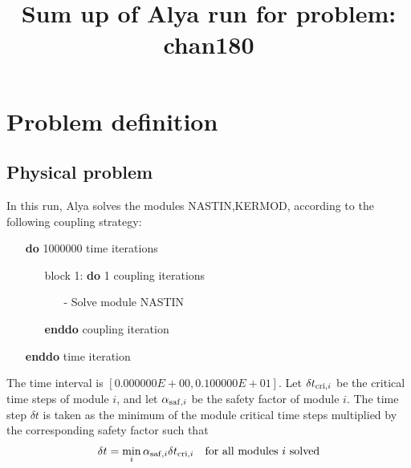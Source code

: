 \documentclass[10pt]{article}
\begin{document}
\title{Sum up of Alya run for problem: chan180}
\maketitle
\section{Problem definition}
\subsection{Physical problem}
In this run, Alya solves the modules NASTIN,KERMOD,
according to the following coupling strategy:
\begin{itemize}
  \item[] {\bf do}      1000000 time iterations 
  \begin{itemize}
\item[] block 1: {\bf do}   1 coupling iterations
\begin{itemize}
  \item[-] Solve module NASTIN
\end{itemize}
\item[] {\bf enddo} coupling iteration
  \end{itemize}
\item[] {\bf enddo} time iteration
\end{itemize}
The time interval is $[
0.000000E+00
,
0.100000E+01
]$.
Let $\delta t_{{\rm cri},i}$ be the critical time steps of module $i$,
and let $\alpha_{{\rm saf},i}$ be the safety factor of module $i$.
The time step $\delta t$ is taken as the minimum of the module critical time steps
multiplied by the corresponding safety factor such that
\begin{eqnarray*}
\delta t = \min_{i} \alpha_{{\rm saf},i} \delta t_{{\rm cri},i}
\quad \mbox{for all modules $i$ solved}
\end{eqnarray*}
\end{document}
